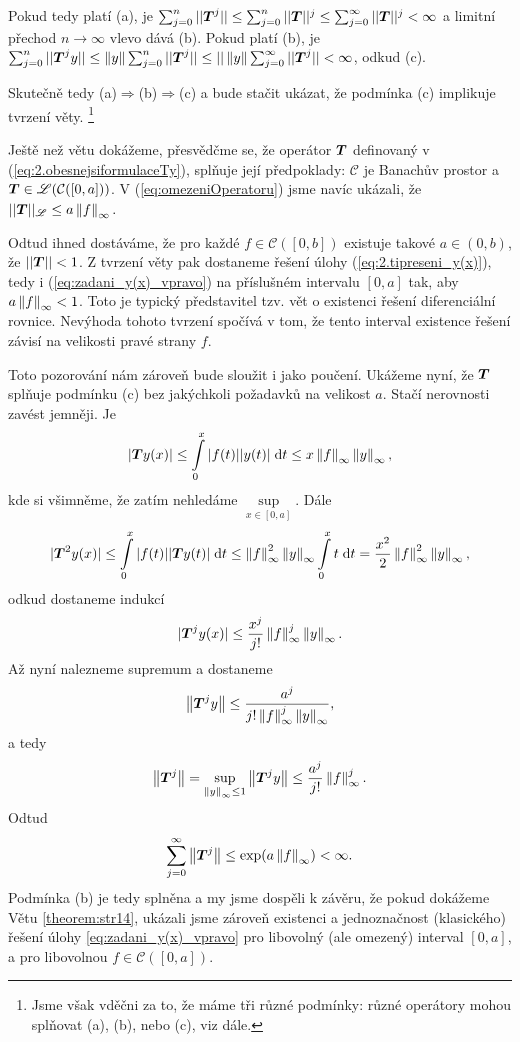 Pokud tedy platí (a), je $\sum_{j=0}^n|| \boldsymbol{T} ^j||\leq\sum_{j=0}^n|| \boldsymbol{T} ||^j\leq \sum_{j=0}^\infty|| \boldsymbol{T} ||^j<\infty$ a limitní přechod $n\rightarrow \infty$ vlevo dává (b). Pokud platí (b), je $\sum_{j=0}^n|| \boldsymbol{T} ^jy||\leq\left\lVert y\right\rVert\sum_{j=0}^n|| \boldsymbol{T} ^j||\leq||\left\lVert y\right\rVert\sum_{j=0}^\infty|| \boldsymbol{T} ^j||<\infty$, odkud (c).

Skutečně tedy (a)$\Rightarrow$(b)$\Rightarrow$(c) a bude stačit ukázat, že podmínka (c) implikuje tvrzení věty. \footnote{Jsme však vděčni za to, že máme tři různé podmínky: různé operátory mohou splňovat (a), (b), nebo (c), viz dále.}

Ještě než větu dokážeme, přesvědčme se, že operátor $ \boldsymbol{T} $ definovaný v (\ref{eq:2.obesnejsiformulaceTy}), splňuje její předpoklady: $\mathcal{C}$ je Banachův prostor a $ \boldsymbol{T} \in\mathscr{L}(\mathcal{C}([0,a]))$. V (\ref{eq:omezeniOperatoru}) jsme navíc ukázali, že $|| \boldsymbol{T} ||_{\mathscr{L}}\leq a\left\lVert f\right\rVert_\infty.$

Odtud ihned dostáváme, že pro každé $f\in\mathcal{C}([0,b])$ existuje takové
$a\in (0,b)$, že $|| \boldsymbol{T} ||<1$.
Z tvrzení věty pak dostaneme  řešení úlohy (\ref{eq:2.tipreseni_y(x)}), tedy i (\ref{eq:zadani_y(x)_vpravo}) na příslušném  intervalu $[0,a]$
tak, aby $a\left\lVert f\right\rVert_\infty<1$. Toto je typický představitel tzv. vět o  existenci řešení diferenciální rovnice. Nevýhoda tohoto tvrzení spočívá v tom, že tento interval existence řešení závisí na velikosti pravé strany $f$.

Toto pozorování nám zároveň bude sloužit i jako poučení. Ukážeme nyní, že $ \boldsymbol{T} $ splňuje podmínku (c) bez jakýchkoli požadavků na velikost $a$. Stačí nerovnosti zavést jemněji. Je 
$$| \boldsymbol{T} y(x)|\leq \int\limits_0^x|f(t)||y(t)|\;\mathrm{d}t\leq x\left\lVert f\right\rVert_\infty\left\lVert y\right\rVert_\infty,$$
kde si všimněme, že zatím nehledáme $\sup\limits_{x\in[0,a]}$. Dále
$$| \boldsymbol{T} ^2y(x)|\leq\int\limits_0^x|f(t)|| \boldsymbol{T} y(t)|\;\mathrm{d}t\leq \left\lVert f\right\rVert^2_\infty\left\lVert y\right\rVert_\infty\int\limits_0^xt\;\mathrm{d}t = \frac{x^2}{2}\left\lVert f\right\rVert^2_\infty\left\lVert y\right\rVert_\infty,$$
odkud dostaneme indukcí
$$| \boldsymbol{T} ^jy(x)|\leq\frac{x^j}{j!}\left\lVert f\right\rVert^j_\infty\left\lVert y\right\rVert_\infty.$$
Až nyní nalezneme supremum a dostaneme 
$$\left\lVert \boldsymbol{T} ^jy\right\rVert\leq\frac{a^j}{j!\left\lVert f\right\rVert^j_\infty\left\lVert y\right\rVert_\infty},$$ a tedy 
$$\left\lVert \boldsymbol{T} ^j\right\rVert=\sup\limits_{\left\lVert y\right\rVert_\infty\leq 1}\left\lVert \boldsymbol{T} ^jy\right\rVert\leq\frac{a^j}{j!}\left\lVert f\right\rVert^j_\infty.$$
Odtud $$\sum\limits_{j=0}^\infty\left\lVert \boldsymbol{T} ^j\right\rVert\leq\exp(a\left\lVert f\right\rVert_\infty)<\infty.$$
Podmínka (b) je tedy splněna a my jsme dospěli k závěru, že pokud dokážeme Větu \ref{theorem:str14}, ukázali jsme zároveň existenci a jednoznačnost (klasického) řešení úlohy \ref{eq:zadani_y(x)_vpravo} pro libovolný (ale omezený) interval $[0,a]$, a pro libovolnou $f\in\mathcal{C}([0,a])$.

